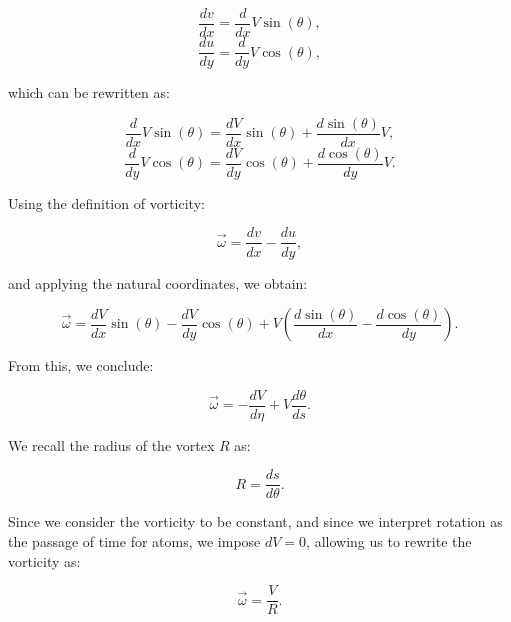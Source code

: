 \begin{equation}
\frac{d v}{d x}=\frac{d}{d x} V \sin (\theta),
\end{equation}
\begin{equation}
\frac{d u}{d y}=\frac{d}{d y} V \cos (\theta),
\end{equation}


which can be rewritten as:


\begin{equation}
\frac{d}{d x} V \sin (\theta) = \frac{d V}{d x} \sin (\theta) + \frac{d \sin (\theta)}{d x} V,
\end{equation}
\begin{equation}
\frac{d}{d y} V \cos (\theta) = \frac{d V}{d y} \cos (\theta) + \frac{d \cos (\theta)}{d y} V.
\end{equation}


Using the definition of vorticity:


\begin{equation}
\vec{\omega} = \frac{d v}{d x} - \frac{d u}{d y},
\end{equation}


and applying the natural coordinates, we obtain:


\begin{equation}
\vec{\omega} = \frac{d V}{d x} \sin (\theta) - \frac{d V}{d y} \cos (\theta) + V\left(\frac{d \sin (\theta)}{d x} - \frac{d \cos (\theta)}{d y}\right).
\end{equation}


From this, we conclude:


\begin{equation}
\vec{\omega} = -\frac{d V}{d \eta} + V \frac{d \theta}{d s}.
\end{equation}


We recall the radius of the vortex $R$ as:


\begin{equation}
R = \frac{d s}{d \theta}.
\end{equation}


Since we consider the vorticity to be constant, and since we interpret rotation as the passage of time for atoms, we impose $dV=0$, allowing us to rewrite the vorticity as:


\begin{equation}
\vec{\omega} = \frac{V}{R}.
\end{equation}

